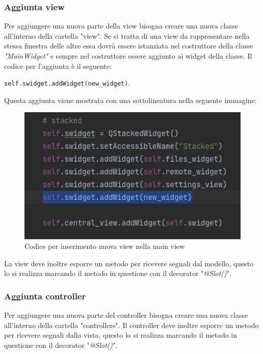 \subsubsection{Aggiunta view}
Per aggiungere una nuova parte della view bisogna creare una nuova classe all'interno della cartella "view". Se si tratta di una view da rappresentare nella stessa finestra delle altre essa dovrà essere istanziata nel costruttore della classe \textit{"MainWidget"} e sempre nel costruttore essere aggiunto ai widget della classe. Il codice per l'aggiunta è il seguente: \newline{} \centerline{ \texttt{self.swidget.addWidget(new\_widget)}.}
Questa aggiunta viene mostrata con una sottolineatura nella seguente immagine:
\begin{figure}[H]
    \centering
    \includegraphics[scale = 0.75]{components/img/codice-nuova-view-su-main-view.png}
    \caption{Codice per inserimento nuova view nella main view}
    \label{fig:Codice per inserimento nuova view nella main view}
\end{figure}
La view deve inoltre esporre un metodo per ricevere segnali dal modello, questo lo si realizza marcando il metodo in questione con il decorator "\textit{@Slot()}".
\subsubsection{Aggiunta controller}
Per aggiungere una nuova parte del controller bisogna creare una nuova classe all'interno della cartella "controllers". Il controller deve inoltre esporre un metodo per ricevere segnali dalla vista, questo lo si realizza marcando il metodo in questione con il decorator "\textit{@Slot()}".

